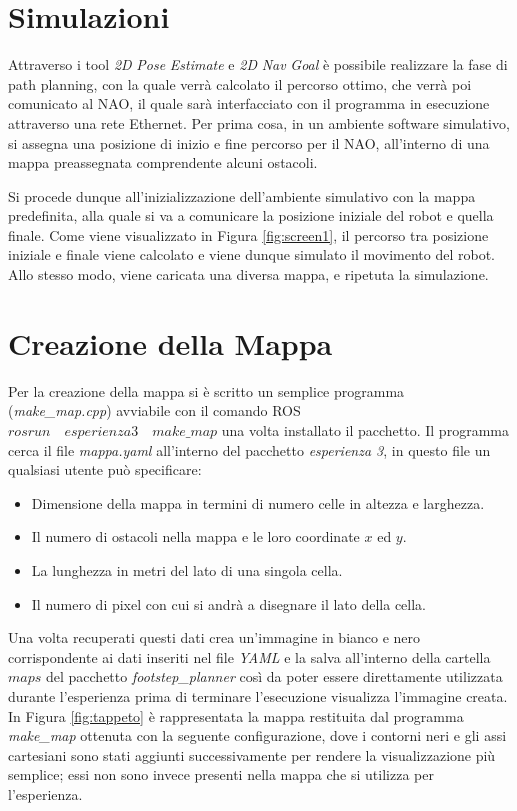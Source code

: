 \documentclass[english]{article}
\begin{document}
\section{Simulazioni}
Attraverso i tool \textit{2D} \textit{Pose} \textit{Estimate} e \textit{2D} \textit{Nav} \textit{Goal} è possibile realizzare la fase di path planning, con la quale verrà calcolato il percorso ottimo, che verrà poi comunicato al NAO, il quale sarà interfacciato con il programma in esecuzione attraverso una rete Ethernet. Per prima cosa, in un ambiente software simulativo, si assegna una posizione di inizio e fine percorso per il NAO, all'interno di una mappa preassegnata comprendente alcuni ostacoli. 


Si procede dunque all'inizializzazione dell'ambiente simulativo con la mappa predefinita, alla quale si va a comunicare la posizione iniziale del robot e quella finale. Come viene visualizzato in Figura \ref{fig:screen1}, il percorso tra posizione iniziale e finale viene calcolato e viene dunque simulato il movimento del robot.
Allo stesso modo, viene caricata una diversa mappa, e ripetuta la simulazione.

\section{Creazione della Mappa}
Per la creazione della mappa si è scritto un semplice programma (\textit{make\_map.cpp}) avviabile con il comando ROS $rosrun \quad esperienza3 \quad make\_map$ una volta installato il pacchetto. Il programma cerca il file \textit{mappa.yaml} all'interno del pacchetto \textit{esperienza 3}, in questo file un qualsiasi utente può specificare:
\begin{itemize}
\item Dimensione della mappa in termini di numero celle in altezza e larghezza.
\item Il numero di ostacoli nella mappa e le loro coordinate $x$ ed $y$.
\item La lunghezza in metri del lato di una singola cella.
\item Il numero di pixel con cui si andrà a disegnare il lato della cella. 
\end{itemize}
Una volta recuperati questi dati crea un'immagine in bianco e nero corrispondente ai dati inseriti nel file \textit{YAML} e la salva all'interno della cartella $maps$ del pacchetto \textit{footstep\_planner} così da poter essere direttamente utilizzata durante l'esperienza prima di terminare l'esecuzione visualizza l'immagine creata. \\
In Figura \ref{fig:tappeto} è rappresentata la mappa restituita dal programma \textit{make\_map} ottenuta con la seguente configurazione, dove i contorni neri e gli assi cartesiani sono stati aggiunti successivamente per rendere la visualizzazione più semplice; essi non sono invece presenti nella mappa che si utilizza per l'esperienza.
\end{document}

